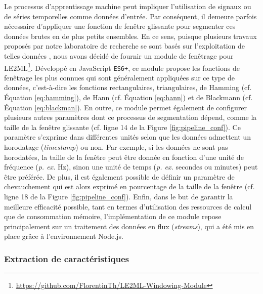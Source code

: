 Le processus d'apprentissage machine peut impliquer l'utilisation de signaux ou de séries temporelles comme données d'entrée. Par conséquent, il demeure parfois nécessaire d'appliquer une fonction de fenêtre glissante pour segmenter ces données brutes en de plus petits ensembles. En ce sens, puisque plusieurs travaux proposés par notre laboratoire de recherche se sont basés sur l'exploitation de telles données \citep{Thullier2017,Chapron2018,Bouchard2020}, nous avons décidé de fournir un module de fenêtrage pour \acs{LE2ML}\footnote{\url{https://github.com/FlorentinTh/LE2ML-Windowing-Module}}. Développé en JavaScript \texttt{ES6+}, ce module propose les fonctions de fenêtrage les plus connues qui sont généralement appliquées sur ce type de données, c'est-à-dire les fonctions rectangulaires, triangulaires, de Hamming (cf. Équation \ref{eq:hamming}), de Hann (cf. Équation \ref{eq:hann}) et de Blackmann (cf. Équation \ref{eq:blackman}). En outre, ce module permet également de configurer plusieurs autres paramètres dont ce processus de segmentation dépend, comme la taille de la fenêtre glissante (cf. ligne 14 de la Figure \ref{fig:pipeline_conf}). Ce paramètre s'exprime dans différentes unités selon que les données admettent un horodatage (\textit{timestamp}) ou non. Par exemple, si les données ne sont pas horodatées, la taille de la fenêtre peut être donnée en fonction d'une unité de fréquence (\textit{p. ex.} Hz), sinon une unité de temps (\textit{p. ex.} secondes ou minutes) peut être préférée. De plus, il est également possible de définir un paramètre de chevauchement qui est alors exprimé en pourcentage de la taille de la fenêtre (cf. ligne 18 de la Figure \ref{fig:pipeline_conf}). Enfin, dans le but de garantir la meilleure efficacité possible, tant en termes d'utilisation des ressources de calcul que de consommation mémoire, l'implémentation de ce module repose principalement sur un traitement des données en flux (\textit{streams}), qui a été mis en place grâce à l'environnement Node.js.

\subsubsection{Extraction de caractéristiques}

